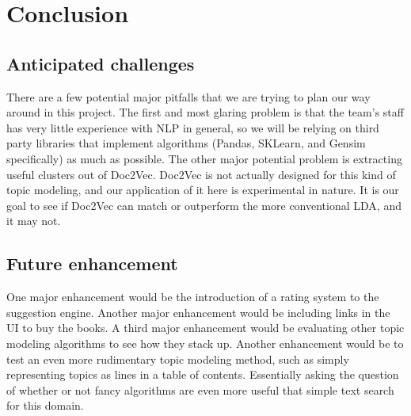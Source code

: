 
\section{Conclusion}
\subsection{Anticipated challenges}
There are a few potential major pitfalls that we are trying to plan our way around in this project.  
The first and most glaring problem is that the team's staff has very little experience with NLP in general, so we will be relying on third party libraries that implement algorithms (Pandas, SKLearn, and Gensim specifically) as much as possible.
The other major potential problem is extracting useful clusters out of Doc2Vec.  
Doc2Vec is not actually designed for this kind of topic modeling, and our application of it here is experimental in nature. 
It is our goal to see if Doc2Vec can match or outperform the more conventional LDA, and it may not.  

\subsection{Future enhancement}
One major enhancement would be the introduction of a rating system to the suggestion engine.  
Another major enhancement would be including links in the UI to buy the books.
A third major enhancement would be evaluating other topic modeling algorithms to see how they stack up.
Another enhancement would be to test an even more rudimentary topic modeling method, such as simply representing topics as lines in a table of contents.  
Essentially asking the question of whether or not fancy algorithms are even more useful that simple text search for this domain.